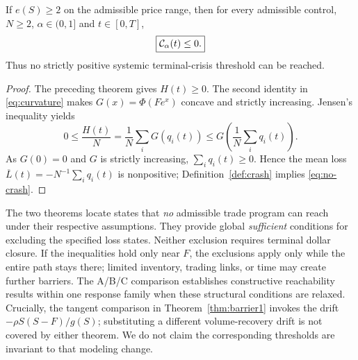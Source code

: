 \documentclass[review,hidelinks,onefignum,onetabnum]{siamonline250211}
\begin{document}
\begin{theorem}\label{thm:barrier2}
If $e(S)\ge2$ on the admissible price range, then for every admissible control, $N\ge2$, $\alpha\in(0,1]$ and $t\in[0,T]$,
\begin{equation}\label{eq:no-crash}
\boxed{\mathcal{C}_\alpha(t)\le0.}
\end{equation}
Thus no strictly positive systemic terminal-crisis threshold can be reached.
\end{theorem}
\begin{proof}
The preceding theorem gives $H(t)\ge0$. The second identity in \eqref{eq:curvature} makes $G(x)=\Phi(Fe^x)$ concave and strictly increasing. Jensen's inequality yields
\[
0\le\frac{H(t)}N=\frac1N\sum_iG(q_i(t))
\le G\!\left(\frac1N\sum_iq_i(t)\right).
\]
As $G(0)=0$ and $G$ is strictly increasing, $\sum_iq_i(t)\ge0$. Hence the mean loss $\overline L(t)=-N^{-1}\sum_iq_i(t)$ is nonpositive; Definition~\ref{def:crash} implies \eqref{eq:no-crash}.
\end{proof}

The two theorems locate states that \emph{no} admissible trade program can reach under their respective assumptions. They provide global \emph{sufficient} conditions for excluding the specified loss states. Neither exclusion requires terminal dollar closure. If the inequalities hold only near $F$, the exclusions apply only while the entire path stays there; limited inventory, trading links, or time may create further barriers. The A/B/C comparison establishes constructive reachability results within one response family when these structural conditions are relaxed. Crucially, the tangent comparison in Theorem~\ref{thm:barrier1} invokes the drift $-\rho S(S-F)/g(S)$; substituting a different volume-recovery drift is not covered by either theorem. We do not claim the corresponding thresholds are invariant to that modeling change.
\end{document}
